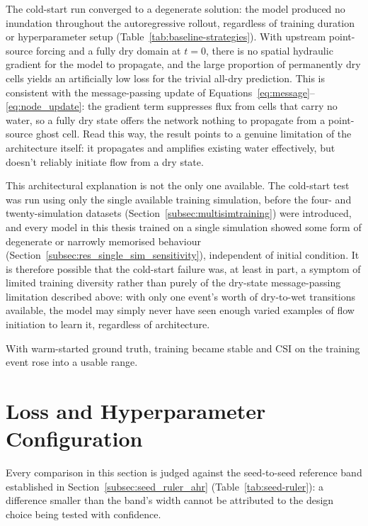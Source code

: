 \documentclass[12pt,a4paper]{report}
\begin{document}
{The cold-start run converged to a degenerate solution: the model produced no
inundation throughout the autoregressive rollout, regardless of training duration or
hyperparameter setup (Table~\ref{tab:baseline-strategies}). With upstream
point-source forcing and a fully dry domain at $t=0$, there is no spatial hydraulic
gradient for the model to propagate, and the large proportion of permanently dry
cells yields an artificially low loss for the trivial all-dry prediction. This is
consistent with the message-passing update of
Equations~\ref{eq:message}--\ref{eq:node_update}: the gradient term suppresses flux
from cells that carry no water, so a fully dry state offers the network nothing to
propagate from a point-source ghost cell. Read this way, the result points to a
genuine limitation of the architecture itself: it propagates and amplifies existing
water effectively, but doesn't reliably initiate flow from a dry state.

This architectural explanation is not the only one available. The cold-start test was run using only the single
available training simulation, before the four- and twenty-simulation datasets
(Section~\ref{subsec:multisimtraining}) were introduced, and every model in this
thesis trained on a single simulation showed some form of degenerate or narrowly
memorised behaviour (Section~\ref{subsec:res_single_sim_sensitivity}), independent of
initial condition. It is therefore possible that the cold-start failure was, at least
in part, a symptom of limited training diversity rather than purely of the dry-state
message-passing limitation described above: with only one event's worth of dry-to-wet
transitions available, the model may simply never have seen enough varied examples
of flow initiation to learn it, regardless of architecture.

With warm-started ground truth, training became stable and CSI on the training event
rose into a usable range.
 
\section{Loss and Hyperparameter Configuration}
\label{sec:res_hyperparam}
 
Every comparison in this section is judged against the seed-to-seed reference band
established in Section~\ref{subsec:seed_ruler_ahr} (Table~\ref{tab:seed-ruler}): a
difference smaller than the band's width cannot be attributed to the design choice being tested with confidence.
 
}
\end{document}
